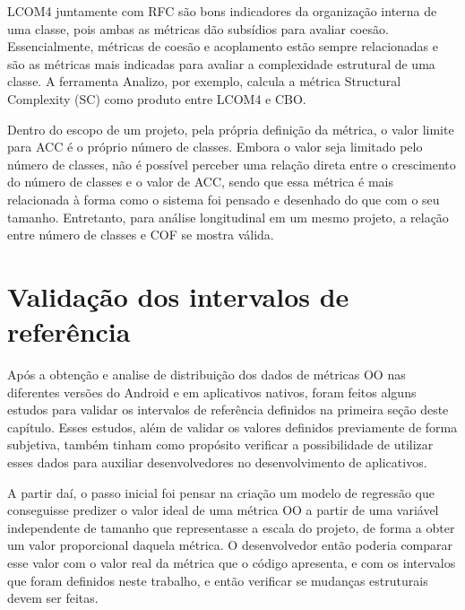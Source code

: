 LCOM4 juntamente com RFC são bons indicadores da organização interna de uma classe, pois ambas as métricas dão subsídios para avaliar coesão. Essencialmente, métricas de coesão e acoplamento estão sempre relacionadas e são as métricas mais indicadas para avaliar a complexidade estrutural de uma classe. A ferramenta Analizo, por exemplo, calcula a métrica Structural Complexity (SC) como produto entre LCOM4 e CBO.


Dentro do escopo de um projeto, pela própria definição da métrica, o valor limite para ACC é o próprio número de classes. Embora o valor seja limitado pelo número de classes, não é possível perceber uma relação direta entre o crescimento do número de classes e o valor de ACC, sendo que essa métrica é mais relacionada à forma como o sistema foi pensado e desenhado do que com o seu tamanho. Entretanto, para análise longitudinal em um mesmo projeto, a relação entre número de classes e COF se mostra válida.

\section{Validação dos intervalos de referência}

Após a obtenção e analise de distribuição dos dados de métricas OO nas diferentes versões do Android e em aplicativos nativos, foram feitos alguns estudos para validar os intervalos de referência definidos na primeira seção deste capítulo. Esses estudos, além de validar os valores definidos previamente de forma subjetiva, também tinham como propósito verificar a possibilidade de utilizar esses dados para auxiliar desenvolvedores no desenvolvimento de aplicativos. 

A partir daí, o passo inicial foi pensar na criação um modelo de regressão que conseguisse predizer o valor ideal de uma métrica OO a partir de uma variável independente de tamanho que representasse a escala do projeto, de forma a obter um valor proporcional daquela métrica. O desenvolvedor então poderia comparar esse valor com o valor real da métrica que o código apresenta, e com os intervalos que foram definidos neste trabalho, e então verificar se mudanças estruturais devem ser feitas.

